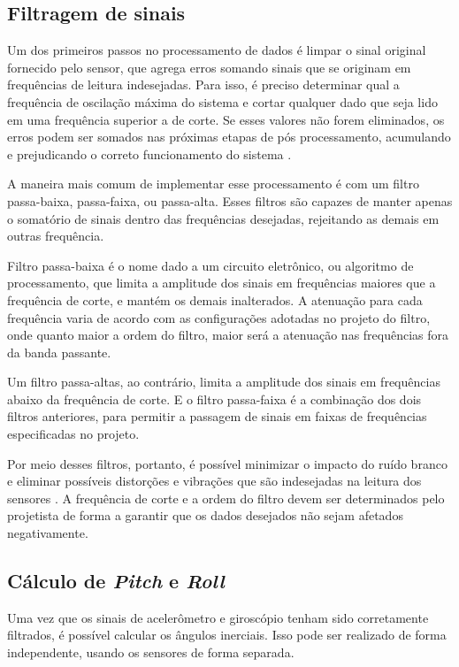 \subsection{Filtragem de sinais}

Um dos primeiros passos no processamento de dados é limpar o sinal original fornecido pelo sensor, que agrega erros somando sinais que se originam em frequências de leitura indesejadas. Para isso, é preciso determinar qual a frequência de oscilação máxima do sistema e cortar qualquer dado que seja lido em uma frequência superior a de corte. Se esses valores não forem eliminados, os erros podem ser somados nas próximas etapas de pós processamento, acumulando e prejudicando o correto funcionamento do sistema \cite{article:Yang2017}.

A maneira mais comum de implementar esse processamento é com um filtro passa-baixa, passa-faixa, ou passa-alta. Esses filtros são capazes de manter apenas o somatório de sinais dentro das frequências desejadas, rejeitando as demais em outras frequência. 

Filtro passa-baixa é o nome dado a um circuito eletrônico, ou algoritmo de processamento, que limita a amplitude dos sinais em frequências maiores que a frequência de corte, e mantém os demais inalterados. A atenuação para cada frequência varia de acordo com as configurações adotadas no projeto do filtro, onde quanto maior a ordem do filtro, maior será a atenuação nas frequências fora da banda passante. 

Um filtro passa-altas, ao contrário, limita a amplitude dos sinais em frequências abaixo da frequência de corte. E o filtro passa-faixa é a combinação dos dois filtros anteriores, para permitir a passagem de sinais em faixas de frequências especificadas no projeto.

Por meio desses filtros, portanto, é possível minimizar o impacto do ruído branco e eliminar possíveis distorções e vibrações que são indesejadas na leitura dos sensores \cite{article:Yang2017}. A frequência de corte e a ordem do filtro devem ser determinados pelo projetista de forma a garantir que os dados desejados não sejam afetados negativamente. 

\subsection{Cálculo de \textit{Pitch} e \textit{Roll}}

Uma vez que os sinais de acelerômetro e giroscópio tenham sido corretamente filtrados, é possível calcular os ângulos inerciais. Isso pode ser realizado de forma independente, usando os sensores de forma separada.

